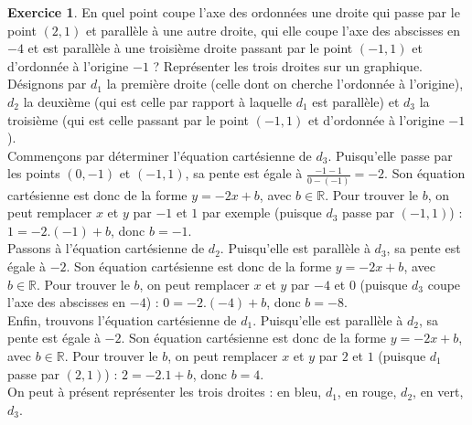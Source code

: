\documentclass[a4paper,13pt]{scrreprt}
\theoremstyle{plain}
\theoremstyle{definition}
\newtheorem{exo}[subsection]{Exercice}
\newcommand{\rr}{\mathbb{R}}
\begin{document}
\begin{exo}
	En quel point coupe l'axe des ordonnées une droite qui passe par le point $(2,1)$ et parallèle à une autre droite, qui elle coupe l'axe des abscisses en $-4$ et est parallèle à une troisième droite passant par le point $(-1,1)$ et d'ordonnée à l'origine $-1$ ? Représenter les trois droites sur un graphique.
	Désignons par $d_1$ la première droite (celle dont on cherche l'ordonnée à l'origine), $d_2$ la deuxième (qui est celle par rapport à laquelle $d_1$ est parallèle) et $d_3$ la troisième (qui est celle passant par le point $(-1,1)$ et d'ordonnée à l'origine $-1$). \\
	Commençons par déterminer l'équation cartésienne de $d_3$. Puisqu'elle passe par les points $(0,-1)$ et $(-1,1)$, sa pente est égale à $\frac{-1-1}{0-(-1)}=-2$. Son équation cartésienne est donc de la forme $y=-2x+b$, avec $b \in \rr$. Pour trouver le $b$, on peut remplacer $x$ et $y$ par $-1$ et $1$ par exemple (puisque $d_3$ passe par $(-1,1)$) : $1=-2.(-1) + b$, donc $b=-1$. \\
	Passons à l'équation cartésienne de $d_2$. Puisqu'elle est parallèle à $d_3$, sa pente est égale à $-2$. Son équation cartésienne est donc de la forme $y=-2x+b$, avec $b \in \rr$. Pour trouver le $b$, on peut remplacer $x$ et $y$ par $-4$ et $0$ (puisque $d_3$ coupe l'axe des abscisses en $-4$) : $0=-2.(-4)+b$, donc $b=-8$. \\
	Enfin, trouvons l'équation cartésienne de $d_1$. Puisqu'elle est parallèle à $d_2$, sa pente est égale à $-2$. Son équation cartésienne est donc de la forme $y=-2x+b$, avec $b \in \rr$. Pour trouver le $b$, on peut remplacer $x$ et $y$ par $2$ et $1$ (puisque $d_1$ passe par $(2,1)$) : $2=-2.1+b$, donc $b=4$. \\
	On peut à présent représenter les trois droites : en bleu, $d_1$, en rouge, $d_2$, en vert, $d_3$. \\
	\begin{center}
	\end{center}
\end{exo}
\end{document}
